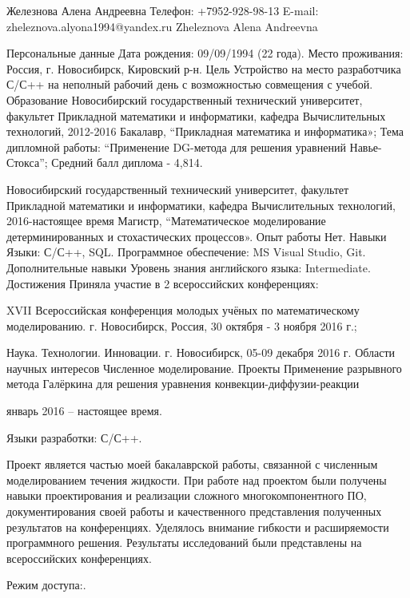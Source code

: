 Железнова Алена Андреевна
Телефон: +7952-928-98-13
E-mail: zheleznova.alyona1994@yandex.ru
Zheleznova Alena Andreevna


Персональные
данные
Дата рождения:  09/09/1994 (22 года).
Место проживания:  Россия, г. Новосибирск, Кировский р-н.
Цель
Устройство на место разработчика С/С++ на неполный рабочий день  с возможностью совмещения с учебой.
Образование
Новосибирский государственный технический университет,
факультет Прикладной математики и информатики,
кафедра Вычислительных технологий,
2012-2016 Бакалавр, “Прикладная математика и информатика»;
Тема дипломной работы: “Применение DG-метода для решения уравнений Навье-Стокса”;
Средний балл диплома - 4,814.

Новосибирский государственный технический университет,
факультет Прикладной математики и информатики,
кафедра Вычислительных технологий,
2016-настоящее время Магистр, “Математическое моделирование детерминированных и стохастических процессов».
Опыт работы
Нет.
Навыки
Языки: С/С++, SQL.
Программное обеспечение: MS Visual Studio, Git.
Дополнительные 
навыки
Уровень знания английского языка: Intermediate.
Достижения
Приняла участие в 2 всероссийских конференциях:

XVII Всероссийская конференция молодых учёных по математическому моделированию. г. Новосибирск, Россия, 30 октября - 3 ноября 2016 г.;

Наука. Технологии. Инновации. г. Новосибирск, 05-09 декабря 2016 г.
Области научных интересов
Численное моделирование.
Проекты
Применение разрывного метода Галёркина для решения уравнения конвекции-диффузии-реакции

январь 2016 – настоящее время.

Языки разработки: С/С++.

Проект является частью моей бакалаврской работы, связанной с численным моделированием течения жидкости. При работе над проектом были получены навыки проектирования и реализации сложного многокомпонентного ПО, документирования своей работы и качественного представления полученных результатов на конференциях. Уделялось внимание гибкости и расширяемости программного решения. Результаты исследований были представлены на всероссийских конференциях.

Режим доступа:.
